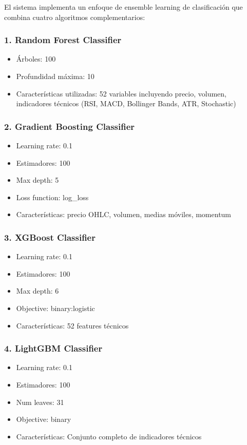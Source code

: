 El sistema implementa un enfoque de ensemble learning de clasificación que combina cuatro algoritmos complementarios:

\subsubsection*{1. Random Forest Classifier}
  \begin{itemize}
      \item Árboles: 100
      \item Profundidad máxima: 10
      \item Características utilizadas: 52 variables incluyendo precio, volumen, indicadores  
  técnicos (RSI, MACD, Bollinger Bands, ATR, Stochastic)
  \end{itemize}

\subsubsection*{2. Gradient Boosting Classifier}
\begin{itemize}
    \item Learning rate: 0.1
    \item Estimadores: 100
    \item Max depth: 5
    \item Loss function: log\_loss
    \item Características: precio OHLC, volumen, medias móviles, momentum
\end{itemize}

\subsubsection*{3. XGBoost Classifier}
\begin{itemize}
    \item Learning rate: 0.1
    \item Estimadores: 100
    \item Max depth: 6
    \item Objective: binary:logistic
    \item Características: 52 features técnicos
\end{itemize}

\subsubsection*{4. LightGBM Classifier}
\begin{itemize}
    \item Learning rate: 0.1
    \item Estimadores: 100
    \item Num leaves: 31
    \item Objective: binary
    \item Características: Conjunto completo de indicadores técnicos
\end{itemize}

